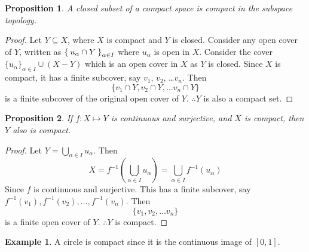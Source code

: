 \documentclass[12pt]{amsart}
\theoremstyle{plain}
\newtheorem*{prop}{Proposition}
\theoremstyle{remark}
\theoremstyle{definition}
\newtheorem*{eg}{Example}
\begin{document}
\begin{prop}
A closed subset of a compact space is compact in the subspace topology.
\end{prop}
\begin{proof}
Let $Y \subseteq X$, where $X$ is compact and $Y$ is closed.
\newline
Consider any open cover of $Y$, written as $\Set{u_{\alpha} \cap Y}_{\alpha \in I}$ where $u_{\alpha}$ is open in $X$.
\newline
Consider the cover $\{u_{\alpha}\}_{\alpha \in I} \cup (X-Y)$ which is an open cover in $X$ as $Y$ is closed. Since $X$ is compact, it has a finite subcover, say $v_1$, $v_2$, \dots $v_n$. Then 
\begin{equation*}
\{v_1\cap Y,v_2\cap Y,\dots v_n\cap Y\}
\end{equation*}
 is a finite subcover of the original open cover of $Y$.
\newline
$\therefore Y$ is also a compact set. 
\end{proof}

\begin{prop}
If $f:X\mapsto Y$ is continuous and surjective, and $X$ is compact, then $Y$ also is compact.
\end{prop}
\begin{proof}
Let $Y = \bigcup\limits_{\alpha \in I} u_{\alpha}$. Then 
\begin{equation*}
X = f^{-1}\left(\bigcup\limits_{\alpha \in I} u_{\alpha}\right) = \bigcup\limits_{\alpha \in I}f^{-1}(u_{\alpha})
\end{equation*}
Since $f$ is continuous and surjective.
This has a finite subcover, say $f^{-1}(v_1),f^{-1}(v_2),\dots ,f^{-1}(v_n)$. Then 
\begin{equation*}
\{v_1, v_2, \dots v_n\}
\end{equation*}
is a finite open cover of $Y$. $\therefore  Y$ is compact.
\end{proof}
\begin{eg}
A circle is compact since it is the continuous image of $[0, 1]$.
\end{eg}
\end{document}
